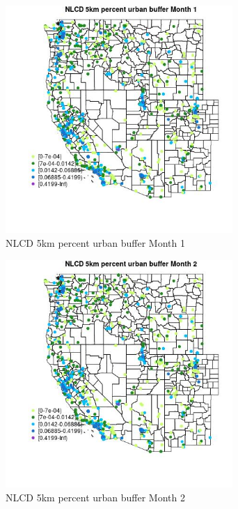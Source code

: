 \begin{figure} 
\centering  
\includegraphics[width=0.77\textwidth]{Code_Outputs/Report_ML_input_PM25_Step4_part_f_de_duplicated_aves_prioritize_24hr_obswNAs_MapObsMo1NLCD_5km_percent_urban_buffer.jpg} 
\caption{\label{fig:Report_ML_input_PM25_Step4_part_f_de_duplicated_aves_prioritize_24hr_obswNAsMapObsMo1NLCD_5km_percent_urban_buffer}NLCD 5km percent urban buffer Month 1} 
\end{figure} 
 

\clearpage 

\begin{figure} 
\centering  
\includegraphics[width=0.77\textwidth]{Code_Outputs/Report_ML_input_PM25_Step4_part_f_de_duplicated_aves_prioritize_24hr_obswNAs_MapObsMo2NLCD_5km_percent_urban_buffer.jpg} 
\caption{\label{fig:Report_ML_input_PM25_Step4_part_f_de_duplicated_aves_prioritize_24hr_obswNAsMapObsMo2NLCD_5km_percent_urban_buffer}NLCD 5km percent urban buffer Month 2} 
\end{figure} 
 

